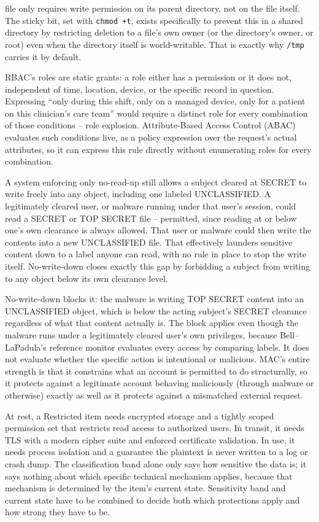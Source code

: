 \begin{answerkey}
file only requires write permission on its parent directory, not on the file itself. The sticky bit,
set with \texttt{chmod +t}, exists specifically to prevent this in a shared directory by restricting
deletion to a file's own owner (or the directory's owner, or root) even when the directory itself is
world-writable. That is exactly why \texttt{/tmp} carries it by default.
\item RBAC's roles are static grants: a role either has a permission or it does not, independent of
time, location, device, or the specific record in question. Expressing ``only during this shift, only
on a managed device, only for a patient on this clinician's care team'' would require a distinct role
for every combination of those conditions -- role explosion. Attribute-Based Access Control (ABAC)
evaluates such conditions live, as a policy expression over the request's actual attributes, so it
can express this rule directly without enumerating roles for every combination.
\item A system enforcing only no-read-up still allows a subject cleared at SECRET to write freely
into any object, including one labeled UNCLASSIFIED. A legitimately cleared user, or malware
running under that user's session, could read a SECRET or TOP SECRET file -- permitted, since
reading at or below one's own clearance is always allowed. That user or malware could then write
the contents into a new UNCLASSIFIED file. That effectively launders sensitive content down to a
label anyone can read, with no rule in place to stop the write itself. No-write-down closes exactly
this gap by forbidding a subject from writing to any object below its own clearance level.
\item No-write-down blocks it: the malware is writing TOP SECRET content into an UNCLASSIFIED
object, which is below the acting subject's SECRET clearance regardless of what that content
actually is. The block applies even though the malware runs under a legitimately cleared user's
own privileges, because Bell--LaPadula's reference monitor evaluates every access by comparing
labels. It does not evaluate whether the specific action is intentional or malicious. MAC's entire
strength is that it constrains what an account is permitted to do structurally, so it protects
against a legitimate account behaving maliciously (through malware or otherwise) exactly as well as
it protects against a mismatched external request.
\item At rest, a Restricted item needs encrypted storage and a tightly scoped permission set that
restricts read access to authorized users. In transit, it needs TLS with a modern cipher suite and
enforced certificate validation. In use, it needs process isolation and a guarantee the plaintext is
never written to a log or crash dump. The classification band alone only says how sensitive the data
is; it says nothing about which specific technical mechanism applies, because that mechanism is
determined by the item's current state. Sensitivity band and current state have to be combined to
decide both which protections apply and how strong they have to be.
\end{answerkey}

